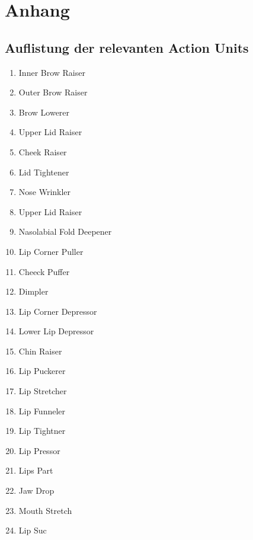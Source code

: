 \chapter{Anhang}

\section{Auflistung der relevanten Action Units}\label{Anhang.AUs}
\begin{multicols}{2}
\begin{enumerate}
    \item{Inner Brow Raiser}
    \item{Outer Brow Raiser}
    \item{Brow Lowerer}
    \item{Upper Lid Raiser}
    \item{Cheek Raiser}
    \item{Lid Tightener}
    \item{Nose Wrinkler}
    \item{Upper Lid Raiser}
    \item{Nasolabial Fold Deepener}
    \item{Lip Corner Puller}
    \item{Cheeck Puffer}
    \item{Dimpler}
    \item{Lip Corner Depressor}
    \item{Lower Lip Depressor}
    \item{Chin Raiser}
    \item{Lip Puckerer}
    \item{Lip Stretcher}
    \item{Lip Funneler}
    \item{Lip Tightner}
    \item{Lip Pressor}
    \item{Lips Part}
    \item{Jaw Drop}
    \item{Mouth Stretch}
    \item{Lip Suc}
\end{enumerate}
\end{multicols}

